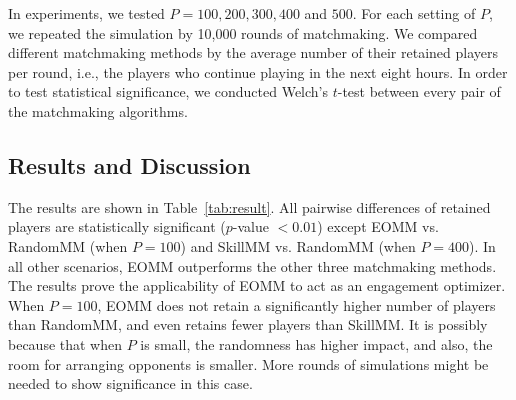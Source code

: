 In experiments, we tested $P=100, 200, 300, 400$ and $500$. For each setting of $P$, we repeated the simulation by 10,000 rounds of matchmaking. We compared different matchmaking methods by the average number of their retained players per round, i.e., the players who continue playing in the next eight hours. In order to test statistical significance, we conducted Welch's $t$-test between every pair of the matchmaking algorithms.







\subsection{Results and Discussion}

The results are shown in Table~\ref{tab:result}. All pairwise differences of retained players are statistically significant ($p$-value $< 0.01$) except EOMM vs.\! RandomMM (when $P=100$) and SkillMM vs.\! RandomMM (when $P=400$). In all other scenarios, EOMM outperforms the other three matchmaking methods. The results prove the applicability of EOMM to act as an engagement optimizer. When $P=100$, EOMM does not retain a significantly higher number of players than RandomMM, and even retains fewer players than SkillMM. It is possibly because that when $P$ is small, the randomness has higher impact, and also, the room for arranging opponents is smaller. More rounds of simulations might be needed to show significance in this case.

